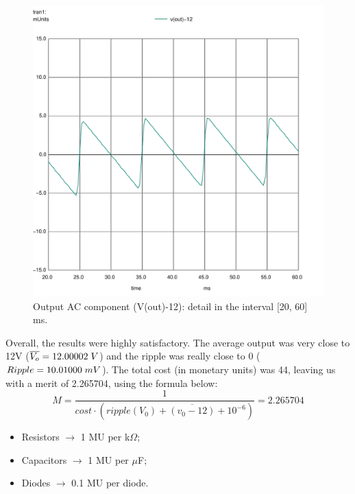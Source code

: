 \begin{figure}[h] \centering
  \includegraphics[scale=0.8]{Spice_t3_2_Zoom.pdf}
  \caption{Output AC component (V(out)-12): detail in the interval [20, 60] ms.}
  \label{fig:44}
\end{figure}

Overall, the results were highly satisfactory. The average output was very close to 12V ($\overline{V_{o}}=12.00002\hspace{1mm}V$)
and the ripple was really close to 0 ($Ripple=10.01000\hspace{1mm}mV$).
The total cost (in monetary units) was 44, leaving us with a merit of 2.265704, using the formula below:
\begin{equation}
  M=\dfrac{1}{cost\cdot \left( ripple\left( V_{0}\right) +\overline{\left( v_{0}-12\right) }+10^{-6}\right)} = 2.265704
\end{equation}
\begin{itemize}
  \item Resistors $\rightarrow$ 1 MU per k$\Omega$;
  \item Capacitors $\rightarrow$ 1 MU per $\mu$F;
  \item Diodes $\rightarrow$ 0.1 MU per diode.
\end{itemize}
